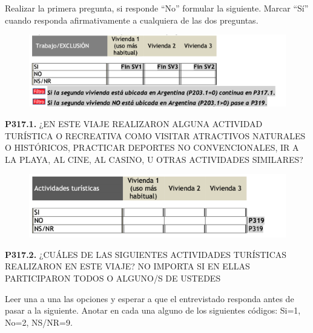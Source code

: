 \documentclass[
  openany]{book}
\begin{document}
Realizar la primera pregunta, si responde ``No'' formular la siguiente. Marcar ``Sí'' cuando responda afirmativamente a cualquiera de las dos preguntas.

\begin{figure}

{\centering \includegraphics[width=1\linewidth]{imagenes/figura6-166} 

}

\end{figure}

\textbf{P317.1.} ¿EN ESTE VIAJE REALIZARON ALGUNA ACTIVIDAD TURÍSTICA O RECREATIVA COMO VISITAR ATRACTIVOS NATURALES O HISTÓRICOS, PRACTICAR DEPORTES NO CONVENCIONALES, IR A LA PLAYA, AL CINE, AL CASINO, U OTRAS ACTIVIDADES SIMILARES?

\begin{figure}

{\centering \includegraphics[width=1\linewidth]{imagenes/figura6-167} 

}

\end{figure}

\textbf{P317.2.} ¿CUÁLES DE LAS SIGUIENTES ACTIVIDADES TURÍSTICAS REALIZARON EN ESTE VIAJE? NO IMPORTA SI EN ELLAS PARTICIPARON TODOS O ALGUNO/S DE USTEDES

Leer una a una las opciones y esperar a que el entrevistado responda antes de pasar a la siguiente. Anotar en cada una alguno de los siguientes códigos: Si=1, No=2, NS/NR=9.
\end{document}
